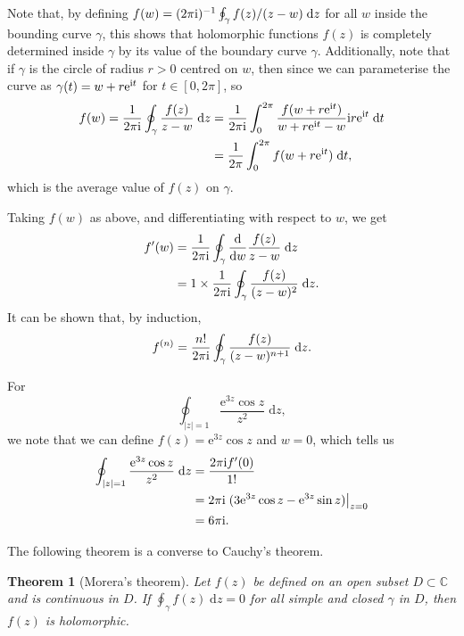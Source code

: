 \documentclass[letter-paper]{tufte-book}
\newtheorem{theorem}{\color{pastel-blue}Theorem}[section]
\newenvironment{example}[1][Example]{\begin{trivlist}
\item[\hskip \labelsep {\bfseries #1}]}{\end{trivlist}}
\newcommand{\ex}{\mathrm{e}}
\newcommand{\zi}{{\rm i}}
\begin{document}
Note that, by defining $f(w) = (2\pi\zi)^{-1}\oint_\gamma f(z)/(z-w)\;
\mathrm{d}z$ for all $w$ inside the bounding curve $\gamma$, this shows that
holomorphic functions $f(z)$ is completely determined inside $\gamma$ by its
value of the boundary curve $\gamma$. Additionally, note that if $\gamma$ is the
circle of radius $r > 0$ centred on $w$, then since we can parameterise the
curve as $\gamma(t) = w + r\ex^{\zi t}$ for $t\in[0, 2\pi]$, so
\begin{align*}
  f(w) = \frac{1}{2\pi\zi} \oint_\gamma \frac{f(z)}{z - w}\; \mathrm{d}z &= \frac{1}{2\pi\zi} \int_0^{2\pi} \frac{f(w + r\ex^{\zi t})}{w + r\ex^{\zi t} - w} \zi r\ex^{\zi t}\; \mathrm{d}t\\
    &= \frac{1}{2\pi} \int_0^{2\pi} f(w + r \ex^{\zi t})\; \mathrm{d}t,
\end{align*}
which is the average value of $f(z)$ on $\gamma$.

Taking $f(w)$ as above, and differentiating with respect to $w$, we get
\begin{align*}
  f'(w) &= \frac{1}{2\pi\zi} \oint_\gamma \frac{\mathrm{d}}{\mathrm{d}w} \frac{f(z)}{z - w}\; \mathrm{d}z\\
    &= 1\times \frac{1}{2\pi\zi} \oint_\gamma \frac{f(z)}{(z - w)^2}\; \mathrm{d}z.
\end{align*}
It can be shown that, by induction,
\begin{equation}
  f^{(n)} = \frac{n!}{2\pi\zi} \oint_\gamma \frac{f(z)}{(z - w)^{n+1}}\; \mathrm{d}z.
\end{equation}

\begin{example}
  For
  \begin{equation*}
    \oint_{|z|=1} \frac{\ex^{3z}\cos z}{z^2}\; \mathrm{d}z,
  \end{equation*}
  we note that we can define $f(z) = \ex^{3z}\cos z$ and $w=0$, which tells us
  \begin{align*}
    \oint_{|z|=1} \frac{\ex^{3z}\cos z}{z^2}\; \mathrm{d}z &= \frac{2\pi\zi f'(0)}{1!} \\
      &= 2\pi\zi \left.(3\ex^{3z}\cos z - \ex^{3z}\sin z)\right|_{z = 0} \\
      &= 6\pi\zi.
  \end{align*}
\end{example}

The following theorem is a converse to Cauchy's theorem.
\begin{theorem}[Morera's theorem]
  Let $f(z)$ be defined on an open subset $D \subset \mathbb{C}$ and is
  continuous in $D$. If $\oint_\gamma f(z)\; \mathrm{d}z = 0$ for all simple and
  closed $\gamma$ in $D$, then $f(z) $ is holomorphic.
\end{theorem}
\end{document}
